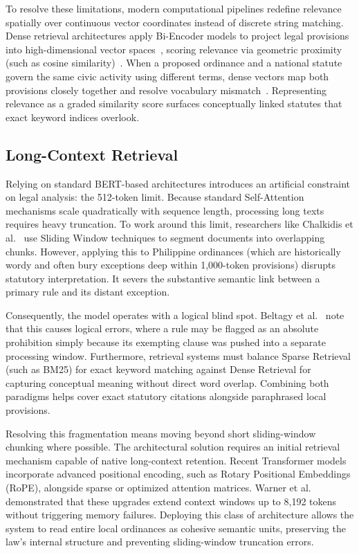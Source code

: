     To resolve these limitations, modern computational pipelines redefine relevance spatially over continuous vector coordinates instead of discrete string matching. Dense retrieval architectures apply Bi-Encoder models to project legal provisions into high-dimensional vector spaces~\cite{reimers2019sentencebert}, scoring relevance via geometric proximity (such as cosine similarity)~\cite{kim2024legal}. When a proposed ordinance and a national statute govern the same civic activity using different terms, dense vectors map both provisions closely together and resolve vocabulary mismatch~\cite{wu2025aiir}. Representing relevance as a graded similarity score surfaces conceptually linked statutes that exact keyword indices overlook.

    \subsection{Long-Context Retrieval} 
    Relying on standard BERT-based architectures introduces an artificial constraint on legal analysis: the 512-token limit. Because standard Self-Attention mechanisms scale quadratically with sequence length, processing long texts requires heavy truncation. To work around this limit, researchers like Chalkidis et al.~\cite{chalkidis2022lexglue} use Sliding Window techniques to segment documents into overlapping chunks. However, applying this to Philippine ordinances (which are historically wordy and often bury exceptions deep within 1,000-token provisions) disrupts statutory interpretation. It severs the substantive semantic link between a primary rule and its distant exception.

    Consequently, the model operates with a logical blind spot. Beltagy et al.~\cite{beltagy2020longformer} note that this causes logical errors, where a rule may be flagged as an absolute prohibition simply because its exempting clause was pushed into a separate processing window. Furthermore, retrieval systems must balance Sparse Retrieval (such as BM25) for exact keyword matching against Dense Retrieval for capturing conceptual meaning without direct word overlap. Combining both paradigms helps cover exact statutory citations alongside paraphrased local provisions.

    Resolving this fragmentation means moving beyond short sliding-window chunking where possible. The architectural solution requires an initial retrieval mechanism capable of native long-context retention. Recent Transformer models incorporate advanced positional encoding, such as Rotary Positional Embeddings (RoPE), alongside sparse or optimized attention matrices. Warner et al.~\cite{warner2024modernbert} demonstrated that these upgrades extend context windows up to 8,192 tokens without triggering memory failures. Deploying this class of architecture allows the system to read entire local ordinances as cohesive semantic units, preserving the law's internal structure and preventing sliding-window truncation errors.

